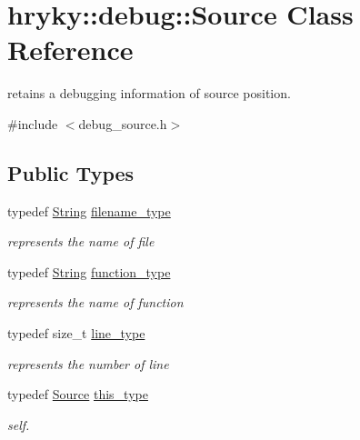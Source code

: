 \hypertarget{classhryky_1_1debug_1_1_source}{\section{hryky\-:\-:debug\-:\-:Source Class Reference}
\label{classhryky_1_1debug_1_1_source}
}


retains a debugging information of source position.  




{\ttfamily \#include $<$debug\-\_\-source.\-h$>$}

\subsection*{Public Types}
\begin{DoxyCompactItemize}
\item 
\hypertarget{classhryky_1_1debug_1_1_source_a443943cd6616be5b4a0c7e200ced19ce}{typedef \hyperlink{classhryky_1_1_string}{String} \hyperlink{classhryky_1_1debug_1_1_source_a443943cd6616be5b4a0c7e200ced19ce}{filename\-\_\-type}}\label{classhryky_1_1debug_1_1_source_a443943cd6616be5b4a0c7e200ced19ce}

\begin{DoxyCompactList}\small\item\em represents the name of file \end{DoxyCompactList}\item 
\hypertarget{classhryky_1_1debug_1_1_source_ae9faf9b2e482bf46211ced4e9a5e4680}{typedef \hyperlink{classhryky_1_1_string}{String} \hyperlink{classhryky_1_1debug_1_1_source_ae9faf9b2e482bf46211ced4e9a5e4680}{function\-\_\-type}}\label{classhryky_1_1debug_1_1_source_ae9faf9b2e482bf46211ced4e9a5e4680}

\begin{DoxyCompactList}\small\item\em represents the name of function \end{DoxyCompactList}\item 
\hypertarget{classhryky_1_1debug_1_1_source_a5cf259e1e55170cf5a025a31576ce7c6}{typedef size\-\_\-t \hyperlink{classhryky_1_1debug_1_1_source_a5cf259e1e55170cf5a025a31576ce7c6}{line\-\_\-type}}\label{classhryky_1_1debug_1_1_source_a5cf259e1e55170cf5a025a31576ce7c6}

\begin{DoxyCompactList}\small\item\em represents the number of line \end{DoxyCompactList}\item 
\hypertarget{classhryky_1_1debug_1_1_source_a0c8dff3e624cee6e70d983de9e346cf9}{typedef \hyperlink{classhryky_1_1debug_1_1_source}{Source} \hyperlink{classhryky_1_1debug_1_1_source_a0c8dff3e624cee6e70d983de9e346cf9}{this\-\_\-type}}\label{classhryky_1_1debug_1_1_source_a0c8dff3e624cee6e70d983de9e346cf9}

\begin{DoxyCompactList}\small\item\em self. \end{DoxyCompactList}\end{DoxyCompactItemize}

